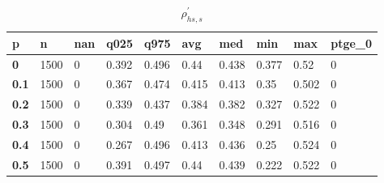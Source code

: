 \begin{table}[h]
 \centering 
\footnotesize
\caption{$\rho_{hs,s}^\prime $}
\label{tab:alphahss}
\begin{tabular}[h]{|l|l|l|l|l|l|l|l|l|l|
    } \hline
\textbf{ p} & \textbf{ n} & \textbf{ nan} & \textbf{ q025} & \textbf{ q975} & \textbf{ avg} & \textbf{ med} & \textbf{ min} & \textbf{ max} & \textbf{ ptge\_0}
    \\ \hline
  \textbf{  0} & 1500 & 0 & 0.392 & 0.496 &  0.44 & 0.438 & 0.377 &  0.52 & 0
    \\ \hline
  \textbf{0.1} & 1500 & 0 & 0.367 & 0.474 & 0.415 & 0.413 &  0.35 & 0.502 & 0
    \\ \hline
  \textbf{0.2} & 1500 & 0 & 0.339 & 0.437 & 0.384 & 0.382 & 0.327 & 0.522 & 0
    \\ \hline
  \textbf{0.3} & 1500 & 0 & 0.304 &  0.49 & 0.361 & 0.348 & 0.291 & 0.516 & 0
    \\ \hline
  \textbf{0.4} & 1500 & 0 & 0.267 & 0.496 & 0.413 & 0.436 &  0.25 & 0.524 & 0
    \\ \hline
  \textbf{0.5} & 1500 & 0 & 0.391 & 0.497 &  0.44 & 0.439 & 0.222 & 0.522 & 0
    \\ \hline
 \end{tabular}
 \end{table}
